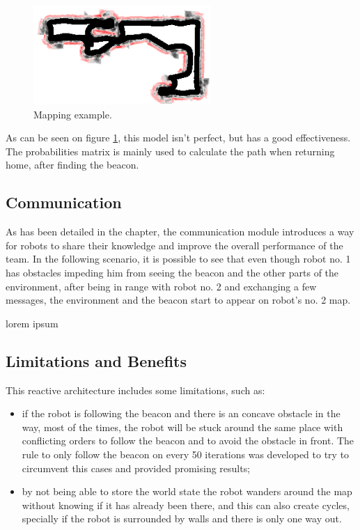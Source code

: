 \documentclass[oribibl]{llncs}
\begin{document}
\begin{figure}
  \centering
  \includegraphics[width=0.6\textwidth]{screenmap.png}
  \caption{Mapping example.}
  \label{fig:screenmap}
\end{figure}

As can be seen on figure \ref{fig:screenmap}, this model isn't perfect, but has a good effectiveness. The probabilities matrix is mainly used to calculate the path when returning home, after finding the beacon.

\subsection{Communication}

As has been detailed in the  chapter, the communication module introduces a way for robots to share their knowledge and improve the overall performance of the team.
In the following scenario, it is possible to see that even though robot no. 1 has obstacles impeding him from seeing the beacon and the other parts of the environment, after being in range with robot no. 2 and exchanging a few messages, the environment and the beacon start to appear on robot’s no. 2 map.

lorem ipsum

\subsection{Limitations and Benefits}
This reactive architecture includes some limitations, such as:

\begin{itemize}
  \item if the robot is following the beacon and there is an concave obstacle in the way, most of the times, the robot will be stuck around the same place with conflicting orders to follow the beacon and to avoid the obstacle in front. The rule to only follow the beacon on every 50 iterations was developed to try to circumvent this cases and provided promising results;
  \item by not being able to store the world state the robot wanders around the map without knowing if it has already been there, and this can also create cycles, specially if the robot is surrounded by walls and there is only one way out.
\end{itemize}
\end{document}
